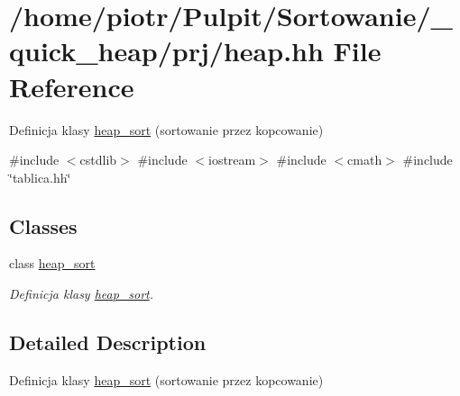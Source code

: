 \hypertarget{heap_8hh}{\section{/home/piotr/\-Pulpit/\-Sortowanie/\-\_\-quick\-\_\-heap/prj/heap.hh \-File \-Reference}
\label{heap_8hh}
}


\-Definicja klasy \hyperlink{classheap__sort}{heap\-\_\-sort} (sortowanie przez kopcowanie)  


{\ttfamily \#include $<$cstdlib$>$}\*
{\ttfamily \#include $<$iostream$>$}\*
{\ttfamily \#include $<$cmath$>$}\*
{\ttfamily \#include \char`\"{}tablica.\-hh\char`\"{}}\*
\subsection*{\-Classes}
\begin{DoxyCompactItemize}
\item 
class \hyperlink{classheap__sort}{heap\-\_\-sort}
\begin{DoxyCompactList}\small\item\em \-Definicja klasy \hyperlink{classheap__sort}{heap\-\_\-sort}. \end{DoxyCompactList}\end{DoxyCompactItemize}


\subsection{\-Detailed \-Description}
\-Definicja klasy \hyperlink{classheap__sort}{heap\-\_\-sort} (sortowanie przez kopcowanie) 